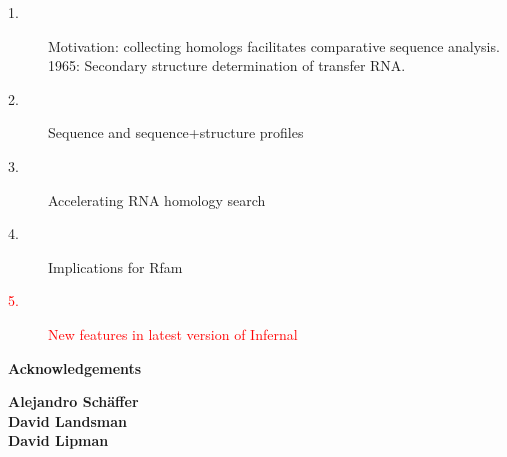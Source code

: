 \documentclass[landscape]{slides}
\begin{document}
\begin{slide}
\begin{slide}
\begin{center}
\begin{description}
\item[1.] Motivation: collecting homologs facilitates comparative
  sequence analysis.\\ 1965: Secondary structure determination of
  transfer RNA.
\item[2.] Sequence and sequence+structure profiles
\item[3.] Accelerating RNA homology search
\item[4.] Implications for Rfam
\item[\textcolor{red}{5.}] \textcolor{red}{New features in latest version of Infernal}
\end{description}

\end{center}
\vfill
\end{slide}
\begin{slide}

\large
\begin{center}
\large{\textbf{Acknowledgements}} \\

\vspace{0.5in}

\textbf{Alejandro Sch\"{a}ffer} \\
\textbf{David Landsman} \\
\textbf{David Lipman}

\vspace{0.5in}


\end{center}
\end{slide}
\end{slide}
\end{document}
